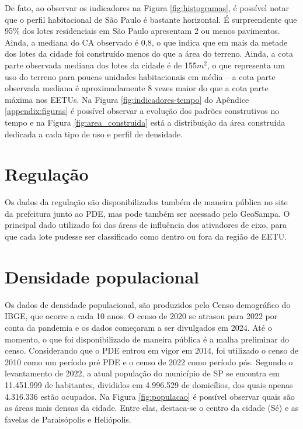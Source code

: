 De fato, ao observar os indicadores na Figura \ref{fig:histogramas}, é possível notar que o perfil habitacional de São Paulo é bastante horizontal. É surpreendente que 95\% dos lotes residenciais em São Paulo apresentam 2 ou menos pavimentos. Ainda, a mediana do CA observado é 0,8, o que indica que em mais da metade dos lotes da cidade foi construído menos do que a área do terreno. Ainda, a cota parte observada mediana dos lotes da cidade é de 155$m^2$, o que representa um uso do terreno para poucas unidades habitacionais em média -- a cota parte observada mediana é aproximadamente 8 vezes maior do que a cota parte máxima nos EETUs. Na Figura \ref{fig:indicadores-tempo} do Apêndice \ref{appendix:figuras} é possível observar a evolução dos padrões construtivos no tempo e na Figura \ref{fig:area_construida} está a distribuição da área construída dedicada a cada tipo de uso e perfil de densidade.

\section{Regulação}
\label{sec:dadosPDE}

Os dados da regulação são disponibilizados também de maneira pública no site da prefeitura junto ao PDE, mas pode também ser acessado pelo GeoSampa. O principal dado utilizado foi das áreas de influência dos ativadores de eixo, para que cada lote pudesse ser classificado como dentro ou fora da região de EETU.

\section{Densidade populacional}
\label{sec:dadosCenso}

Os dados de densidade populacional, são produzidos pelo Censo demográfico do IBGE, que ocorre a cada 10 anos. O censo de 2020 se atrasou para 2022 por conta da pandemia e os dados começaram a ser divulgados em 2024. Até o momento, o que foi disponibilizado de maneira pública é a malha preliminar do censo. Considerando que o PDE entrou em vigor em 2014, foi utilizado o censo de 2010 como um período pré PDE e o censo de 2022 como período pós. Segundo o levantamento de 2022, a atual população do município de SP se encontra em 11.451.999 de habitantes, divididos em 4.996.529 de domicílios, dos quais apenas 4.316.336 estão ocupados. Na Figura \ref{fig:populacao} é possível observar quais são as áreas mais densas da cidade. Entre elas, destaca-se o centro da cidade (Sé) e as favelas de Paraisópolis e Heliópolis.

